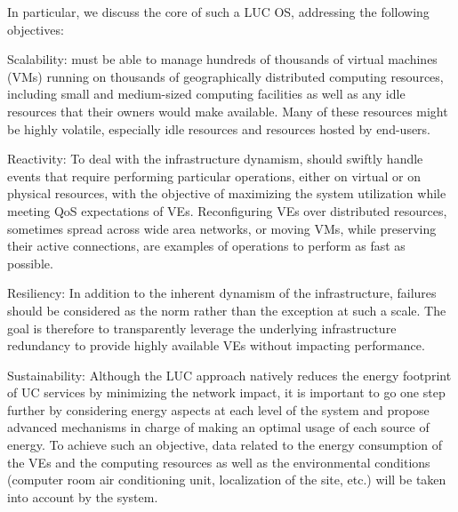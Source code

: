 In particular, we discuss the core of such a LUC
OS, addressing the following objectives:
\begin{description} 
\item Scalability: \discovery must be able to manage hundreds of
  thousands of virtual machines (VMs) running on thousands of
  geographically distributed computing resources, including small and
  medium-sized computing facilities as well as any idle resources that
  their owners would make available. Many of these resources might be
  highly volatile, especially idle resources and resources hosted by
  end-users.
\item Reactivity: To deal with the infrastructure dynamism, \discovery
  should swiftly handle events that require performing particular
  operations, either on virtual or on physical resources, with the
  objective of maximizing the system utilization while meeting QoS expectations of VEs. 
  Reconfiguring  VEs over distributed resources, sometimes spread across wide area networks, or moving VMs, 
  while preserving their active connections, are examples of operations to perform as fast as possible.
\item Resiliency: In addition to the inherent dynamism of the
  infrastructure, failures should be considered as the norm rather
  than the exception at such a scale. The goal is therefore to
  transparently leverage the underlying infrastructure redundancy to
  provide highly available VEs without impacting performance.
\item Sustainability: Although the LUC approach natively reduces the energy
footprint of UC services by minimizing the network impact, it is important to go one
step further by considering energy aspects at each level of the \discovery
system and propose advanced mechanisms in charge of making an optimal usage of each source of energy. 
 To achieve such an objective, data related to the energy
  consumption of the VEs  and the computing resources
  as well as the environmental conditions (computer room air conditioning unit, localization of the
  site, etc.) will be taken into account by the system.
\end{description}

